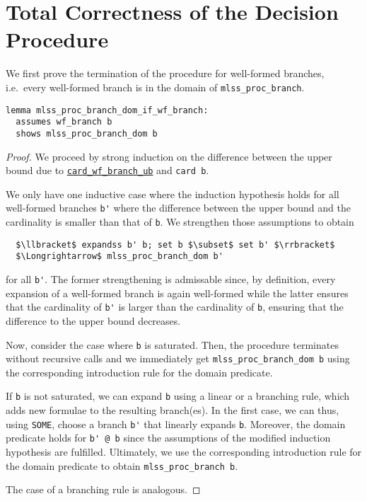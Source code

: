 \documentclass[sigplan,10pt,anonymous,review]{acmart}
\begin{document}
\section{Total Correctness of the Decision Procedure\label{sec:correct}}
We first prove the termination of the procedure for well-formed branches, i.e.\ every well-formed branch is in the domain of \lstinline!mlss_proc_branch!.
\begin{lstlisting}[belowskip=0pt]
lemma mlss_proc_branch_dom_if_wf_branch:
  assumes wf_branch b
  shows mlss_proc_branch_dom b
\end{lstlisting}
\begin{proof}
  We proceed by strong induction on the difference between the upper bound due to \hyperref[lst:card_branch]{\lstinline!card_wf_branch_ub!} and \lstinline!card b!.

  We only have one inductive case where the induction hypothesis holds for all well-formed branches \lstinline!b'! where the difference between the upper bound and the cardinality is smaller than that of \lstinline!b!.
  We strengthen those assumptions to obtain
\begin{lstlisting}
  $\llbracket$ expandss b' b; set b $\subset$ set b' $\rrbracket$
  $\Longrightarrow$ mlss_proc_branch_dom b'
\end{lstlisting}
for all \lstinline!b'!.
The former strengthening is admissable since, by definition, every expansion of a well-formed branch is again well-formed while the latter ensures that the cardinality of \lstinline!b'! is larger than the cardinality of \lstinline!b!, ensuring that the difference to the upper bound decreases.

Now, consider the case where \lstinline!b! is saturated.
Then, the procedure terminates without recursive calls and we immediately get \lstinline!mlss_proc_branch_dom b! using the corresponding introduction rule for the domain predicate.

If \lstinline!b! is not saturated, we can expand \lstinline!b! using a linear or a branching rule, which adds new formulae to the resulting branch(es).
In the first case, we can thus, using \lstinline!SOME!, choose a branch \lstinline!b'! that linearly expands \lstinline!b!.
Moreover, the domain predicate holds for \lstinline!b' @ b! since the assumptions of the modified induction hypothesis are fulfilled.
Ultimately, we use the corresponding introduction rule for the domain predicate to obtain \lstinline!mlss_proc_branch b!.

The case of a branching rule is analogous.
\end{proof}
\end{document}
